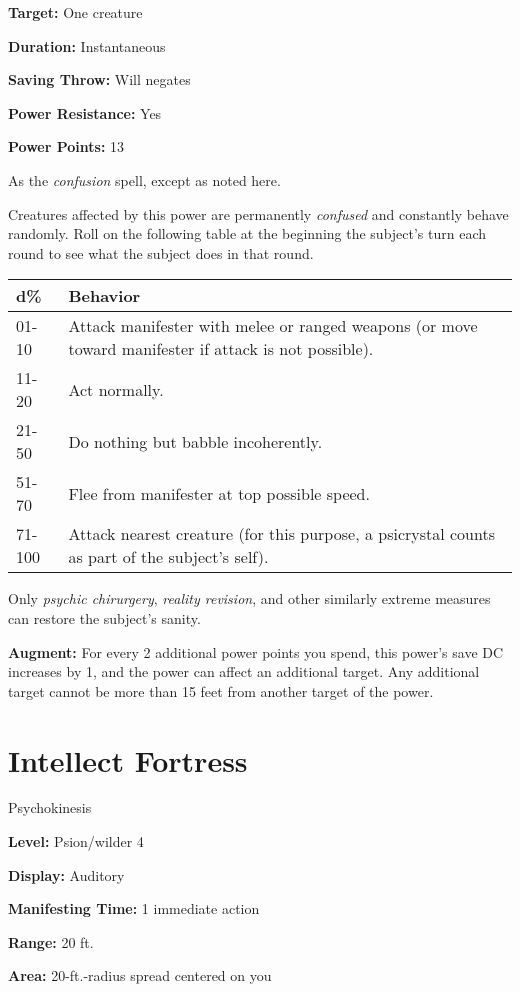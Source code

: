 \documentclass{article}
\begin{document}
\textbf{Target:} One creature

\textbf{Duration:} Instantaneous

\textbf{Saving Throw:} Will negates

\textbf{Power Resistance:} Yes

\textbf{Power Points:} 13

As the \textit{confusion} spell, except as noted here. 

Creatures affected by this power are permanently \textit{confused }and constantly 
behave randomly. Roll on the following table at the beginning the subject's turn 
each round to see what the subject does in that round.

\begin{tabular}{|>{\raggedright}p{28pt}|>{\raggedright}p{233pt}|}
\hline
d\textbf{\%} & B\textbf{ehavior}\tabularnewline
\hline
01-10 & Attack manifester with melee or ranged weapons (or move toward manifester 
if attack is not possible).\tabularnewline
\hline
11-20 & Act normally.\tabularnewline
\hline
21-50 & Do nothing but babble incoherently.\tabularnewline
\hline
51-70 & Flee from manifester at top possible speed.\tabularnewline
\hline
71-100 & Attack nearest creature (for this purpose, a psicrystal counts as part 
of the subject's self).\tabularnewline
\hline
\end{tabular}

Only \textit{psychic chirurgery}, \textit{reality revision}, and other similarly 
extreme measures can restore the subject's sanity.

\textbf{Augment:} For every 2 additional power points you spend, this power's save 
DC increases by 1, and the power can affect an additional target. Any additional 
target cannot be more than 15 feet from another target of the power.

\vspace{12pt}
\section*{Intellect Fortress}

Psychokinesis

\textbf{Level:} Psion/wilder 4

\textbf{Display:} Auditory

\textbf{Manifesting Time:} 1 immediate action

\textbf{Range:} 20 ft.

\textbf{Area:} 20-ft.-radius spread centered on you
\end{document}
